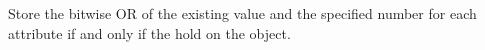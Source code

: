 Store the bitwise OR of the existing value and the specified number for each
attribute if and only if the  hold on the object.



